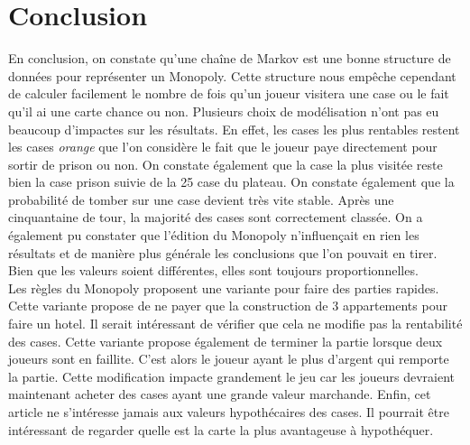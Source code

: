 \documentclass[letterpaper]{article}
\begin{document}
\section{Conclusion}
  En conclusion, on constate qu'une chaîne de Markov est une bonne
  structure de données pour représenter un Monopoly.  Cette structure
  nous empêche cependant de calculer facilement le nombre de fois
  qu'un joueur visitera une case ou le fait qu'il ai une carte chance ou non.
  Plusieurs choix de modélisation n'ont pas eu beaucoup d'impactes
  sur les résultats.  En effet, les cases les plus rentables restent les 
  cases \textit{orange} que l'on considère le fait que le joueur paye
  directement pour sortir de prison ou non.  On constate également que
  la case la plus visitée reste bien la case prison suivie de la 25
  case du plateau.  On constate également que la probabilité de tomber sur
  une case devient très vite stable.  Après une cinquantaine de tour, la
  majorité des cases sont correctement classée.  On a également pu 
  constater que l'édition du Monopoly n'influençait en rien les résultats
  et de manière plus générale les conclusions que l'on pouvait en tirer.
  Bien que les valeurs soient différentes, elles sont toujours 
  proportionnelles.\\
  Les règles du Monopoly proposent une variante pour faire des parties
  rapides.  Cette variante propose de ne payer que la construction de 3 
  appartements pour faire un hotel.  Il serait intéressant de vérifier que
  cela ne modifie pas la rentabilité des cases. Cette variante propose
  également de terminer la partie lorsque deux joueurs sont en faillite.
  C'est alors le joueur ayant le plus d'argent qui remporte la partie.
  Cette modification impacte grandement le jeu car les joueurs devraient
  maintenant acheter des cases ayant une grande valeur marchande.  Enfin,
  cet article ne s'intéresse jamais aux valeurs hypothécaires des cases. 
  Il pourrait être intéressant de regarder quelle est la carte la plus 
  avantageuse à hypothéquer.
  
  
\footnotesize
\nocite{*}



  
\newpage
\appendix
  \onecolumn
  
\end{document}
